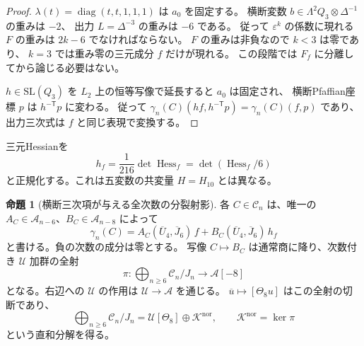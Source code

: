 \documentclass[a4paper,11pt]{ltjsarticle}
\theoremstyle{definition}
\newtheorem{theorem}{命題}[section]
\begin{document}
\begin{proof}
$\lambda(t)=\operatorname{diag}(t,t,1,1,1)$ は $a_0$ を固定する。
横断変数 $b\in\Lambda^2Q_3\otimes\Delta^{-1}$ の重みは $-2$、
出力 $L=\Delta^{-3}$ の重みは $-6$ である。
従って $\varepsilon^k$ の係数に現れる $F$ の重みは $2k-6$ でなければならない。
$F$ の重みは非負なので $k<3$ は零であり、
$k=3$ では重み零の三元成分 $f$ だけが現れる。
この段階では $F_f$ に分離してから論じる必要はない。

$h\in\mathrm{SL}(Q_3)$ を $L_2$ 上の恒等写像で延長すると $a_0$ は固定され、
横断Pfaffian座標 $p$ は $h^{-\mathsf T}p$ に変わる。
従って
$\gamma_n(C)(hf,h^{-\mathsf T}p)=\gamma_n(C)(f,p)$
であり、出力三次式は $f$ と同じ表現で変換する。
\end{proof}

三元Hessianを
\[
 h_f=\frac1{216}\det\operatorname{Hess}_f
     =\det(\operatorname{Hess}_f/6)
\]
と正規化する。これは五変数の共変量 $H=H_{10}$ とは異なる。

\begin{theorem}[横断三次項が与える全次数の分裂射影]
\label{thm:v17-split-normal-projection}
各 $C\in\mathcal C_n$ は、唯一の
$A_C\in\mathcal A_{n-6}$、$B_C\in\mathcal A_{n-8}$ によって
\begin{equation}\label{eq:v17-normal-covariant-decomposition}
 \gamma_n(C)=A_C(\overline U_4,\overline J_6)\,f
            +B_C(\overline U_4,\overline J_6)\,h_f
\end{equation}
と書ける。負の次数の成分は零とする。
写像 $C\mapsto B_C$ は通常商に降り、次数付き $\mathcal U$ 加群の全射
\begin{equation}\label{eq:v17-normal-projection}
 \pi:\bigoplus_{n\ge6}\mathcal C_n/J_n
       \longrightarrow\mathcal A[-8]
\end{equation}
となる。右辺への $\mathcal U$ の作用は $\mathcal U\to\mathcal A$ を通じる。
$\overline u\mapsto[\Theta_8u]$ はこの全射の切断であり、
\begin{equation}\label{eq:v17-normal-splitting}
 \bigoplus_{n\ge6}\mathcal C_n/J_n
   =\mathcal U[\Theta_8]\oplus\mathcal K^{\mathrm{nor}},
 \qquad \mathcal K^{\mathrm{nor}}=\ker\pi
\end{equation}
という直和分解を得る。
\end{theorem}
\end{document}
